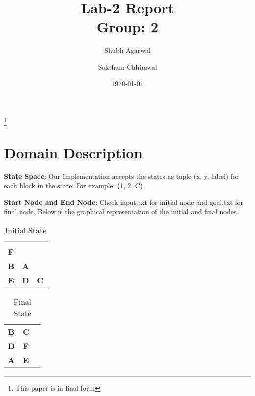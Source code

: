 \documentclass[a4paper,10pt,reqno,oneside]{amsart}
\begin{document}
\title[Block World Domain (Greedy Approach)]{Lab-2 Report\\Group: 2}
\author{Shubh Agarwal}
%

\author{Saksham Chhimwal}
%
\thanks{This paper is in final form}
\date{\today}

\maketitle

\section{Domain Description}

\textbf{State Space}: Our Implementation accepts the states as tuple (x, y, label) for each block in the state. 
For example: (1, 2, C)

\textbf{Start Node and End Node}: Check input.txt for initial node and goal.txt for final node. Below 
is the graphical representation of the initial and final nodes.

\begin{table}[h]
    \begin{tabular}{ccc}
    \textbf{}  & \textbf{}  & \textbf{}  \\
    \textbf{F} & \textbf{}  & \textbf{}  \\
    \textbf{B} & \textbf{A} & \textbf{}  \\
    \textbf{E} & \textbf{D} & \textbf{C}
    \end{tabular}
    \caption{Initial State}
\end{table}

\begin{table}[h]
    \begin{tabular}{ccc}
    \textbf{B} & \textbf{C} & \textbf{} \\
    \textbf{D} & \textbf{F} & \textbf{} \\
    \textbf{A} & \textbf{E} & \textbf{}
    \end{tabular}
    \caption{Final State}
\end{table}
\end{document}
